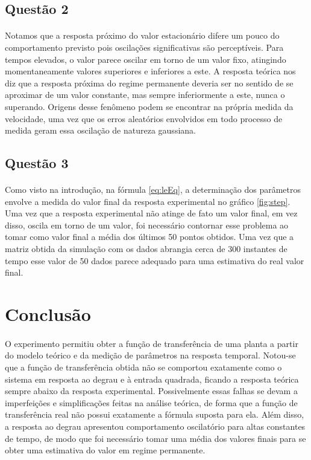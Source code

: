 \documentclass[a4paper,11pt]{article}
\begin{document}
\subsection{Questão 2}
\paragraph{} Notamos que a resposta próximo do valor estacionário difere um
pouco do comportamento previsto pois oscilações significativas são
perceptíveis. Para tempos elevados, o valor parece oscilar em torno de um
valor fixo, atingindo momentaneamente valores superiores e inferiores a este. 
A resposta teórica nos diz que a resposta próxima do regime permanente deveria
ser no sentido de se aproximar de um valor constante, mas sempre inferiormente
a este, nunca o superando. Origens desse fenômeno podem se encontrar na própria
medida da velocidade, uma vez que os erros aleatórios envolvidos em todo
processo de medida geram essa oscilação de natureza gaussiana.

\subsection{Questão 3}
\paragraph{} Como visto na introdução, na fórmula \ref{eq:leEq}, a determinação
dos parâmetros envolve a medida do valor final da resposta experimental no
gráfico \ref{fig:step}. Uma vez que a resposta experimental não atinge de fato
um valor final, em vez disso, oscila em torno de um valor, foi necessário
contornar esse problema ao tomar como valor final a média dos últimos 50 pontos
obtidos. Uma vez que a matriz obtida da simulação com os dados abrangia cerca
de 300 instantes de tempo esse valor de 50 dados parece adequado para uma
estimativa do real valor final.

\newpage
\section{Conclusão}
\paragraph{} O experimento permitiu obter a função de transferência 
de uma planta a partir do modelo teórico e da medição de parâmetros 
na resposta temporal. Notou-se que a função de transferência obtida 
não se comportou exatamente como o sistema em resposta ao degrau e à 
entrada quadrada, ficando a resposta teórica sempre abaixo da 
resposta experimental. Possivelmente essas falhas se devam a 
imperfeições e simplificações feitas na análise teórica, de forma que 
a função de transferência real não possui exatamente a fórmula 
suposta para ela. Além disso, a resposta ao degrau apresentou comportamento
oscilatório para altas constantes de tempo, de modo que foi necessário tomar
uma média dos valores finais para se obter uma estimativa do valor em regime
permanente.
\end{document}
